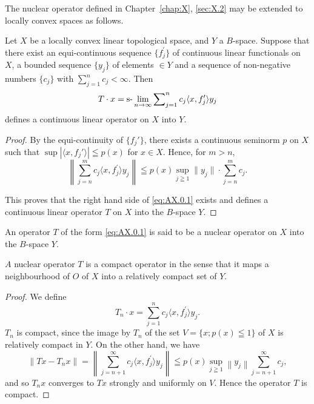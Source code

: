 \label{chap:AX}

The nuclear operator defined in Chapter~\ref{chap:X}, \ref{sec:X.2} may be extended to locally convex spaces as follows. 

\begin{proposition}\label{prop:AX.0.Proposition.1} Let $X$ be a locally convex linear topological space, and $Y$ a $B$-space. Suppose that there exist an equi-continuous sequence $\{f_{j}^{\prime}\}$ of continuous linear functionals on $X$, a bounded sequence $\{y_{j}\}$ of elements $\in Y$ and a sequence of non-negative numbers $\{c_{j}\}$ with $\sum\limits_{j=1}^{n} c_{j} < \infty$. Then 
\begin{equation}\label{eq:AX.0.1}
T \cdot x = \text{s-}\lim _{n \rightarrow \infty} \sum\nolimits_{j=1} ^{n} c _{j} \langle x, f _{j} ^{\prime} \rangle y _{j}
\end{equation}
defines a continuous linear operator on $X$ into $Y$. 
\end{proposition}

\begin{proof}
 By the equi-continuity of $\{f_j'\}$, there exists a continuous seminorm $p$ on $X$ such that $\sup |\langle x, f_j' \rangle| \leqq p(x)$ for $x \in X$. Hence, for $m > n$, 
\[
\left\| \sum\limits_{j=n} ^{m} c _{j} \langle x, f _{j} ^{\prime} \rangle y _{j} \right\| \leqq p (x) \sup\limits _{j \geqq 1} \| y _{j} \| \cdot \sum\limits_{j=n} ^{m} c _{j}. \]

This proves that the right hand side of \eqref{eq:AX.0.1} exists and defines a continuous linear operator $T$ on $X$ into the $B$-space $Y$. 
\end{proof}

\begin{definition}\label{def:AX.0.Definition.1} An operator $T$ of the form \eqref{eq:AX.0.1} is said to be a nuclear operator on $X$ into the $B$-space $Y$. 
\end{definition}

\begin{corollaryu} $A$ nuclear operator $T$ is a compact operator in the sense that it maps a neighbourhood of $O$ of $X$ into a relatively compact set of $Y$. 

\end{corollaryu}

\begin{proof}
 We define 
\[
T _{n} \cdot x = \sum\limits_{j=1} ^{n} c _{j} \langle x, f _{j} ^{\prime} \rangle y _{j}.
\]
$T_{n}$ is compact, since the image by $T_{n}$ of the set $V = \{x; p(x) \leqq 1\}$ of $X$ is relatively compact in $Y$. On the other hand, we have 
\[
\left\| T x - T _{n} x \right\| = \left\| \sum\limits_{j=n+1} ^{\infty} c _{j} \langle x, f _{j} ^{\prime} \rangle y _{j} \right\| \leqq p (x) \sup\limits _{j \geqq 1} \left\| y _{j} \right\| \sum\limits_{j=n+1} ^{\infty} c _{j},
\]
and so $T_{n}x$ converges to $Tx$ strongly and uniformly on $V$. Hence the operator $T$ is compact. 
\end{proof}

